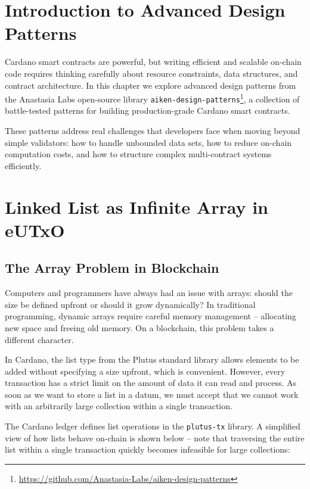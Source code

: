 
\section{Introduction to Advanced Design Patterns} \label{sec:advanced-intro}

Cardano smart contracts are powerful, but writing efficient and scalable on-chain code requires thinking carefully about resource constraints, data structures, and contract architecture. In this chapter we explore advanced design patterns from the Anastasia Labs open-source library \texttt{aiken-design-patterns}\footnote{\url{https://github.com/Anastasia-Labs/aiken-design-patterns}}, a collection of battle-tested patterns for building production-grade Cardano smart contracts.

These patterns address real challenges that developers face when moving beyond simple validators: how to handle unbounded data sets, how to reduce on-chain computation costs, and how to structure complex multi-contract systems efficiently.

\section{Linked List as Infinite Array in eUTxO} \label{sec:linked-list}

\subsection{The Array Problem in Blockchain}

Computers and programmers have always had an issue with arrays: should the size be defined upfront or should it grow dynamically? In traditional programming, dynamic arrays require careful memory management -- allocating new space and freeing old memory. On a blockchain, this problem takes a different character.

In Cardano, the list type from the Plutus standard library allows elements to be added without specifying a size upfront, which is convenient. However, every transaction has a strict limit on the amount of data it can read and process. As soon as we want to store a list in a datum, we must accept that we cannot work with an arbitrarily large collection within a single transaction.

The Cardano ledger defines list operations in the \texttt{plutus-tx} library. A simplified view of how lists behave on-chain is shown below -- note that traversing the entire list within a single transaction quickly becomes infeasible for large collections:

